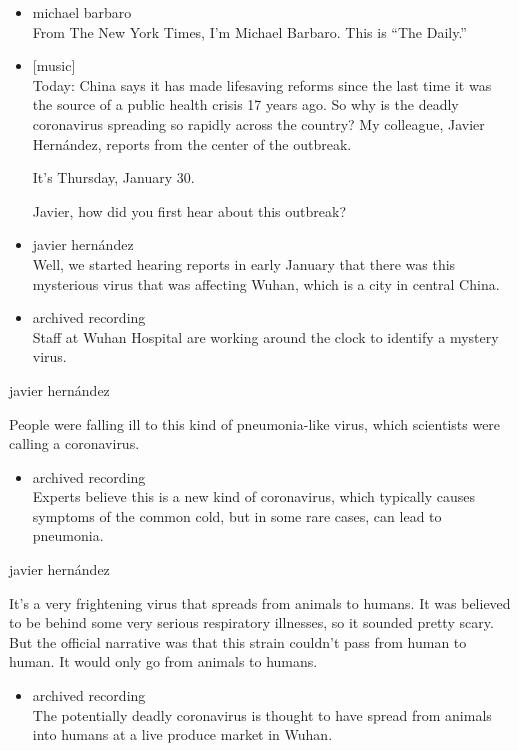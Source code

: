 \begin{itemize}
\item
  michael barbaro\\
  From The New York Times, I'm Michael Barbaro. This is ``The Daily.''
\item
  {[}music{]}\\
  Today: China says it has made lifesaving reforms since the last time
  it was the source of a public health crisis 17 years ago. So why is
  the deadly coronavirus spreading so rapidly across the country? My
  colleague, Javier Hernández, reports from the center of the outbreak.

  It's Thursday, January 30.

  Javier, how did you first hear about this outbreak?
\item
  javier hernández\\
  Well, we started hearing reports in early January that there was this
  mysterious virus that was affecting Wuhan, which is a city in central
  China.
\item
  archived recording\\
  Staff at Wuhan Hospital are working around the clock to identify a
  mystery virus.
\end{itemize}

javier hernández

People were falling ill to this kind of pneumonia-like virus, which
scientists were calling a coronavirus.

\begin{itemize}
\tightlist
\item
  archived recording\\
  Experts believe this is a new kind of coronavirus, which typically
  causes symptoms of the common cold, but in some rare cases, can lead
  to pneumonia.
\end{itemize}

javier hernández

It's a very frightening virus that spreads from animals to humans. It
was believed to be behind some very serious respiratory illnesses, so it
sounded pretty scary. But the official narrative was that this strain
couldn't pass from human to human. It would only go from animals to
humans.

\begin{itemize}
\tightlist
\item
  archived recording\\
  The potentially deadly coronavirus is thought to have spread from
  animals into humans at a live produce market in Wuhan.
\end{itemize}

